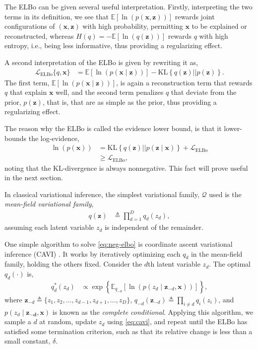 The ELBo can be given several useful interpretation. Firstly, interpreting the two terms in its definition, we see that $\mathbb{E}\left[\ln(p(\mathbf{x},\mathbf{z}))\right]$ rewards joint configurations of $(\mathbf{x},\mathbf{z})$ with high probability, permitting $\mathbf{x}$ to be explained or reconstructed, whereas $H(q)=-\mathbb{E}\left[\ln(q(\mathbf{z}))\right]$ rewards $q$ with high entropy, i.e., being less informative, thus providing a regularizing effect.

A second interpretation of the ELBo is given by rewriting it as,
\begin{align*}
	\mathcal{L}_{\text{ELBo}}\{q,\mathbf{x}\} &= \mathbb{E}\left[\ln(p(\mathbf{x}\mid\mathbf{z}))\right] - \text{KL}\left\{q(\mathbf{z})||p(\mathbf{z})\right\}.
\end{align*}
The first term, $\mathbb{E}\left[\ln(p(\mathbf{x}\mid\mathbf{z}))\right]$, is again a reconstruction term that rewards $q$ that explain $\mathbf{x}$ well, and the second term penalizes $q$ that deviate from the prior, $p(\mathbf{z})$, that is, that are as simple as the prior, thus providing a regularizing effect.

The reason why the ELBo is called the evidence lower bound, is that it lower-bounds the log-evidence,
\begin{align*}
	\ln\left(p\left(\mathbf{x}\right)\right) &= \text{KL}\left\{q(\mathbf{z})||p(\mathbf{z}\mid\mathbf{x})\right\} + \mathcal{L}_{\text{ELBo}}\\
	&\ge \mathcal{L}_{\text{ELBo}},
\end{align*}
noting that the KL-divergence is always nonnegative. This fact will prove useful in the next section.

In classical variational inference, the simplest variational family, $\mathcal{Q}$ used is the \emph{mean-field variational family},
\begin{align*}
	q(\mathbf{z}) &\triangleq \prod^D_{d=1}q_d(z_d),
\end{align*} 
assuming each latent variable $z_d$ is independent of the remainder.

One simple algorithm to solve \eqref{eq:neg-elbo} is coordinate ascent variational inference (CAVI) \citep{BleiEtAl2016}. It works by iteratively optimizing each $q_d$ in the mean-field family, holding the others fixed. Consider the $d$th latent variable $z_d$. The optimal $q_d(\cdot)$ is,
\begin{align}\label{eq:cavi}
	q^*_d(z_d) &\propto \exp\left\{\mathbb{E}_{q_{-d}}\left[\ln\left(p(z_d\mid\mathbf{z}_{-d},\mathbf{x})\right)\right]\right\},
\end{align}
where $\mathbf{z}_{-d}\triangleq\{z_1,z_2,\ldots,z_{d-1},z_{d+1},\ldots,z_D\}$, $q_{-d}(\mathbf{z}_{-d})\triangleq\prod_{i\neq d}q_i(z_i)$, and $p(z_d\mid\mathbf{z_{-d}},\mathbf{x})$ is known as the \emph{complete conditional}. Applying this algorithm, we sample a $d$ at random, update $z_d$ using \eqref{eq:cavi}, and repeat until the ELBo has satisfied some termination criterion, such as that its relative change is less than a small constant, $\delta$.

